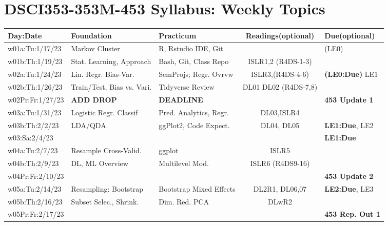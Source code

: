 \documentclass[10pt]{article} %
\begin{document}
\section{DSCI353-353M-453 Syllabus: Weekly Topics}
\FloatBarrier
\begin{table}[h]
  \centering %
  \begin{tabular}{| l | p{3.9cm} | p{3.7cm} | c | p{2.8cm} |} %
    \hline %
    Day:Date & Foundation & Practicum & Readings(optional) & Due(optional) \\ %
    \hline
    \hline %
    w01a:Tu:1/17/23 & Markov Cluster & R, Rstudio IDE, Git & & (LE0) \\ %
    \hline %
    w01b:Th:1/19/23 & Stat. Learning, Approach & Bash, Git, Class Repo & ISLR1,2 (R4DS-1-3) & \\
    \hline
    \hline
    w02a:Tu:1/24/23 & Lin. Regr. Bias-Var. & SemProjs; Regr. Ovrvw & ISLR3,(R4DS-4-6) & {\bf (LE0:Due)} LE1 \\
    \hline
    w02b:Th:1/26/23 & Train/Test, Bias vs. Vari. & Tidyverse Review  & DL01 DL02 (R4DS-7,8) &  \\
    \hline
    w02Pr:Fr:1/27/23 & \textbf{ADD DROP} & \textbf{DEADLINE} & & {\bf 453 Update 1} \\
    \hline
    \hline
    w03a:Tu:1/31/23 & Logistic Regr. Classif & Pred. Analytics, Regr. & DL03,ISLR4 & \\
    \hline
    w03b:Th:2/2/23 & LDA/QDA & ggPlot2, Code Expect. & DL04, DL05 & {\bf LE1:Due}, LE2 \\
    \hline
    w03:Sa:2/4/23 &  & & & {\bf LE1:Due} \\
    \hline
    \hline
    w04a:Tu:2/7/23 & Resample Cross-Valid. & ggplot & ISLR5 & \\
    \hline
    w04b:Th:2/9/23 & DL, ML Overview & Multilevel Mod.  & ISLR6 (R4DS9-16) & \\
    \hline
    w04Pr:Fr:2/10/23 &  & &  & {\bf 453 Update 2} \\
    \hline
    \hline
    w05a:Tu:2/14/23 & Resampling: Bootstrap & Bootstrap Mixed Effects & DL2R1, DL06,07 & {\bf LE2:Due}, LE3 \\
    \hline
    w05b:Th:2/16/23 & Subset Selec., Shrink. & Dim. Red. PCA & DLwR2 & \\
    \hline
    w05Pr:Fr:2/17/23 &  & &  & {\bf 453 Rep. Out 1} \\

\end{tabular}
\end{table}
\end{document}
